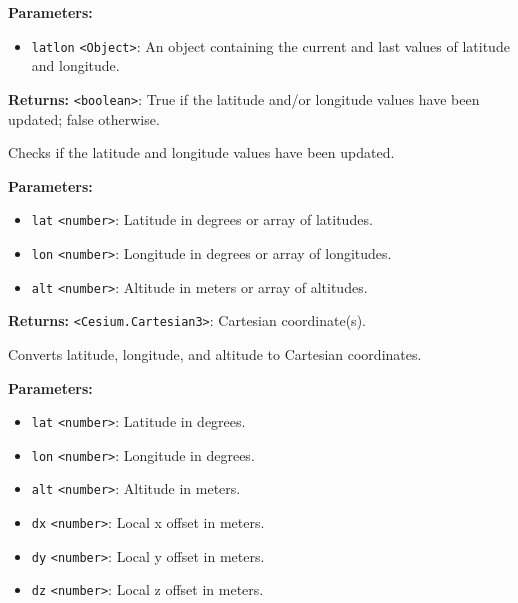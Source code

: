 \documentclass[12pt,a4paper]{article}
\begin{document}
\noindent \textbf{Parameters:}
\begin{itemize}
  \item \texttt{latlon} \texttt{<Object>}: An object containing the current and last values of latitude and longitude.
\end{itemize}

\noindent \textbf{Returns:} \texttt{<boolean>}: True if the latitude and/or longitude values have been updated; false otherwise.

\noindent Checks if the latitude and longitude values have been updated.

\vspace{5mm}
\noindent {}


\noindent \textbf{Parameters:}
\begin{itemize}
  \item \texttt{lat} \texttt{<number>}: Latitude in degrees or array of latitudes.
  \item \texttt{lon} \texttt{<number>}: Longitude in degrees or array of longitudes.
  \item \texttt{alt} \texttt{<number>}: Altitude in meters or array of altitudes.
\end{itemize}

\noindent \textbf{Returns:} \texttt{<Cesium.Cartesian3>}: Cartesian coordinate(s).

\noindent Converts latitude, longitude, and altitude to Cartesian coordinates.

\vspace{5mm}
\noindent {}


\noindent \textbf{Parameters:}
\begin{itemize}
  \item \texttt{lat} \texttt{<number>}: Latitude in degrees.
  \item \texttt{lon} \texttt{<number>}: Longitude in degrees.
  \item \texttt{alt} \texttt{<number>}: Altitude in meters.
  \item \texttt{dx} \texttt{<number>}: Local x offset in meters.
  \item \texttt{dy} \texttt{<number>}: Local y offset in meters.
  \item \texttt{dz} \texttt{<number>}: Local z offset in meters.
\end{itemize}
\end{document}

